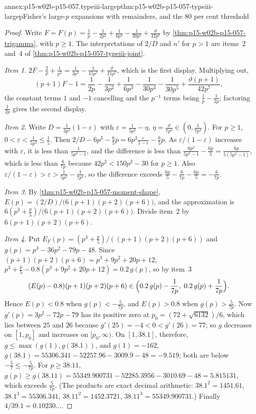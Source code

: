 \begin{annexitem}{annex:p15-w02b-p15-057.typeiii-largep}{thm:p15-w02b-p15-057-typeiii-largep}{Fisher's large-\(p\) expansions with remainders, and the 80 per cent threshold}
\begin{proof}
Write \(F=F(p)=\frac1p-\frac1{2p^2}+\frac1{6p^3}-\frac1{30p^5}+\frac{\vartheta}{42p^7}\)
by \cref{thm:p15-w02b-p15-057-trigamma}, with \(p\geq1\). The
interpretations of \(2/D\) and \(n'\) for \(p>1\) are items~2 and~4 of
\cref{thm:p15-w02b-p15-057-typeiii-joint}.

\emph{Item 1.} \(2F-\frac2p+\frac1{p^2}=\frac1{3p^3}-\frac1{15p^5}
+\frac{\vartheta}{21p^7}\), which is the first display. Multiplying out,
\[
 (p+1)F-1=\frac1{2p}-\frac1{3p^2}+\frac1{6p^3}-\frac1{30p^4}-\frac1{30p^5}
 +\frac{\vartheta(p+1)}{42p^7},
\]
the constant terms \(1\) and \(-1\) cancelling and the \(p^{-1}\) terms
being \(\frac1p-\frac1{2p}\); factoring \(\frac1{2p}\) gives the second
display.

\emph{Item 2.} Write \(D=\frac1{3p^3}(1-\varepsilon)\) with
\(\varepsilon=\frac1{5p^2}-\eta\), \(\eta=\frac{\vartheta}{7p^4}\in
(0,\frac1{7p^4})\). For \(p\geq1\), \(0<\varepsilon<\frac1{5p^2}\leq\frac15\).
Then \(2/D-6p^3-\frac65p=6p^3\frac{\varepsilon}{1-\varepsilon}-\frac65p\).
As \(\varepsilon/(1-\varepsilon)\) increases with \(\varepsilon\), it is
less than \(\frac1{5p^2-1}\), and the difference is less than
\(\frac{6p^3}{5p^2-1}-\frac{6p}5=\frac{6p}{5(5p^2-1)}\), which is less than
\(\frac6{7p}\) because \(42p^2<150p^2-30\) for \(p\geq1\). Also
\(\varepsilon/(1-\varepsilon)>\varepsilon>\frac1{5p^2}-\frac1{7p^4}\), so
the difference exceeds \(\frac{6p}5-\frac6{7p}-\frac{6p}5=-\frac6{7p}\).

\emph{Item 3.} By \cref{thm:p15-w02b-p15-057-moment-shape},
\(E(p)=(2/D)/\bigl(6(p+1)(p+2)(p+6)\bigr)\), and the approximation is
\(6(p^3+\frac p5)/\bigl(6(p+1)(p+2)(p+6)\bigr)\). Divide item~2 by
\(6(p+1)(p+2)(p+6)\).

\emph{Item 4.} Put \(E_F(p)=(p^3+\frac p5)/((p+1)(p+2)(p+6))\) and
\(g(p)=p^3-36p^2-79p-48\). Since
\((p+1)(p+2)(p+6)=p^3+9p^2+20p+12\),
\(p^3+\frac p5-0.8(p^3+9p^2+20p+12)=0.2\,g(p)\), so by item~3
\[
 (E(p)-0.8)(p+1)(p+2)(p+6)\in\Bigl(0.2\,g(p)-\frac1{7p},\;
 0.2\,g(p)+\frac1{7p}\Bigr).
\]
Hence \(E(p)<0.8\) when \(g(p)<-\frac5{7p}\), and \(E(p)>0.8\) when
\(g(p)>\frac5{7p}\). Now \(g'(p)=3p^2-72p-79\) has its positive zero at
\(p_0=(72+\sqrt{6132})/6\), which lies between \(25\) and \(26\) because
\(g'(25)=-4<0<g'(26)=77\); so \(g\) decreases on \([1,p_0]\) and increases
on \([p_0,\infty)\). On \([1,38.1]\), therefore,
\(g\leq\max(g(1),g(38.1))\), and \(g(1)=-162\),
\(g(38.1)=55306.341-52257.96-3009.9-48=-9.519\); both are below
\(-\frac57\leq-\frac5{7p}\). For \(p\geq38.11\),
\(g(p)\geq g(38.11)=55349.900731-52285.3956-3010.69-48=5.815131\), which
exceeds \(\frac5{7p}\). (The products are exact decimal arithmetic:
\(38.1^2=1451.61\), \(38.1^3=55306.341\), \(38.11^2=1452.3721\),
\(38.11^3=55349.900731\).) Finally \(4/39.1=0.10230\ldots\).


\end{proof}
\end{annexitem}
